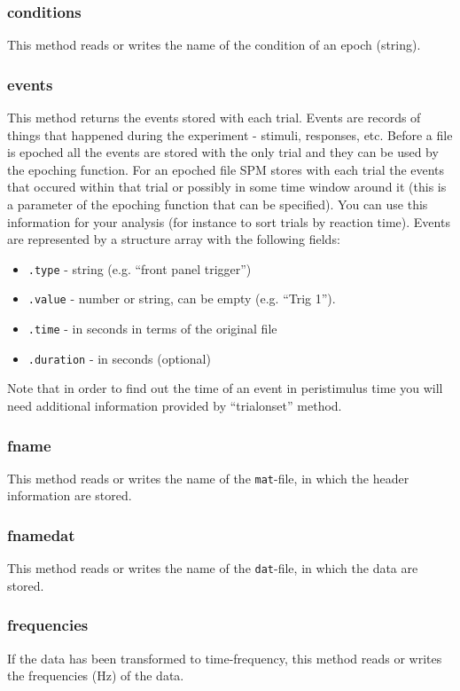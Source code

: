 \subsubsection{conditions}
This method  reads or writes the name of the condition of an epoch (string).

\subsubsection{events}
This method returns the events stored with each trial. Events are records of things that happened during the experiment - stimuli, responses, etc. Before a file is epoched all the events are stored with the only trial and they can be used by the epoching function. For an epoched file SPM stores with each trial the events that occured within that trial or possibly in some time window around it (this is a parameter of the epoching function that can be specified). You can use this information for your analysis (for instance to sort trials by reaction time). Events are represented by a structure array with the following fields:

\begin{itemize}
\item \texttt{.type} - string (e.g. ``front panel trigger'')
\item \texttt{.value} - number or string, can be empty (e.g. ``Trig 1'').
\item \texttt{.time} - in seconds in terms of the original file
\item \texttt{.duration} - in seconds (optional)
\end{itemize}

Note that in order to find out the time of an event in peristimulus time you will need additional information provided by ``trialonset'' method.

\subsubsection{fname}
This method reads or writes the name of the \texttt{mat}-file, in which the header information are stored.

\subsubsection{fnamedat}
This method reads or writes the name of the \texttt{dat}-file, in which the data are stored.

\subsubsection{frequencies}
If the data has been transformed to time-frequency, this method reads or writes the frequencies (Hz) of the data.

